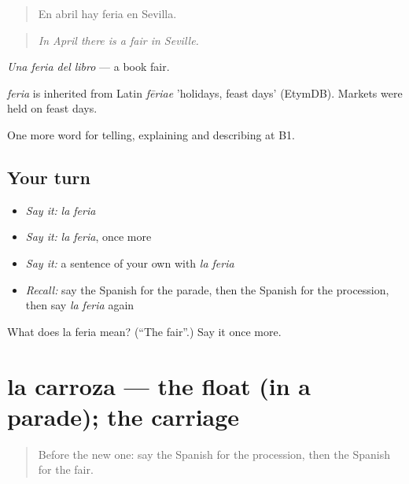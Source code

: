 \begin{quote}
En abril hay feria en Sevilla.
\end{quote}

\begin{quote}
\emph{In April there is a fair in Seville.}
\end{quote}

\emph{Una feria del libro} — a book fair.

\begin{cousinweb}
\emph{feria} is inherited from Latin \emph{fēriae} 'holidays, feast days' (EtymDB). Markets were held on feast days.
\end{cousinweb}

\begin{grammarlens}[title={What you've built}]
One more word for telling, explaining and describing at B1.
\end{grammarlens}

\subsection*{Your turn}
\begin{itemize}
\raggedright
  \item \emph{Say it:} \emph{la feria}
  \item \emph{Say it:} \emph{la feria}, once more
  \item \emph{Say it:} a sentence of your own with \emph{la feria}
  \item \emph{Recall:} say the Spanish for the parade, then the Spanish for the procession, then say \emph{la feria} again
\end{itemize}

\begin{tcolorbox}[breakable,colback=teal!4,colframe=teal!35!black,title={Before you move on}]
What does la feria mean? (\textquotedblleft{}The fair\textquotedblright{}.) Say it once more.
\end{tcolorbox}
\section[la carroza]{la carroza — the float (in a parade); the carriage}

\label{lesson:ES-C559-carroza}



\begin{quote}
Before the new one: say the Spanish for the procession, then the Spanish for the fair.
\end{quote}


